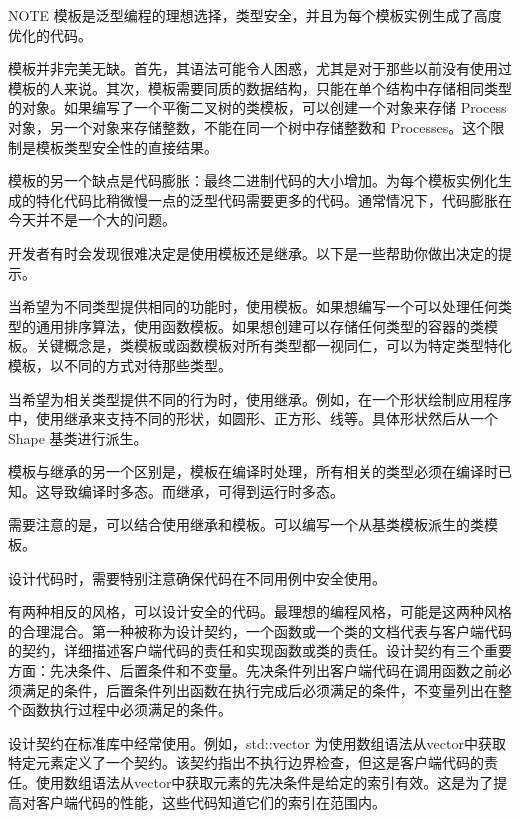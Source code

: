 \begin{myNotic}{NOTE}
模板是泛型编程的理想选择，类型安全，并且为每个模板实例生成了高度优化的代码。
\end{myNotic}


模板并非完美无缺。首先，其语法可能令人困惑，尤其是对于那些以前没有使用过模板的人来说。其次，模板需要同质的数据结构，只能在单个结构中存储相同类型的对象。如果编写了一个平衡二叉树的类模板，可以创建一个对象来存储 Process 对象，另一个对象来存储整数，不能在同一个树中存储整数和 Processes。这个限制是模板类型安全性的直接结果。

模板的另一个缺点是代码膨胀：最终二进制代码的大小增加。为每个模板实例化生成的特化代码比稍微慢一点的泛型代码需要更多的代码。通常情况下，代码膨胀在今天并不是一个大的问题。


开发者有时会发现很难决定是使用模板还是继承。以下是一些帮助你做出决定的提示。

当希望为不同类型提供相同的功能时，使用模板。如果想编写一个可以处理任何类型的通用排序算法，使用函数模板。如果想创建可以存储任何类型的容器的类模板。关键概念是，类模板或函数模板对所有类型都一视同仁，可以为特定类型特化模板，以不同的方式对待那些类型。

当希望为相关类型提供不同的行为时，使用继承。例如，在一个形状绘制应用程序中，使用继承来支持不同的形状，如圆形、正方形、线等。具体形状然后从一个 Shape 基类进行派生。

模板与继承的另一个区别是，模板在编译时处理，所有相关的类型必须在编译时已知。这导致编译时多态。而继承，可得到运行时多态。

需要注意的是，可以结合使用继承和模板。可以编写一个从基类模板派生的类模板。


设计代码时，需要特别注意确保代码在不同用例中安全使用。

有两种相反的风格，可以设计安全的代码。最理想的编程风格，可能是这两种风格的合理混合。第一种被称为设计契约，一个函数或一个类的文档代表与客户端代码的契约，详细描述客户端代码的责任和实现函数或类的责任。设计契约有三个重要方面：先决条件、后置条件和不变量。先决条件列出客户端代码在调用函数之前必须满足的条件，后置条件列出函数在执行完成后必须满足的条件，不变量列出在整个函数执行过程中必须满足的条件。

设计契约在标准库中经常使用。例如，std::vector 为使用数组语法从vector中获取特定元素定义了一个契约。该契约指出不执行边界检查，但这是客户端代码的责任。使用数组语法从vector中获取元素的先决条件是给定的索引有效。这是为了提高对客户端代码的性能，这些代码知道它们的索引在范围内。

